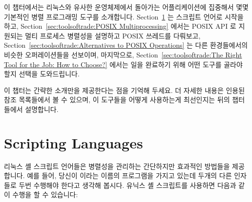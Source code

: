 
%

이 챕터에서는 리눅스와 유사한 운영체제에서 돌아가는 어플리케이션에 집중해서
몇몇 기본적인 병렬 프로그래밍 도구를 소개합니다.
Section~\ref{sec:toolsoftrade:Scripting Languages} 는 스크립트 언어로 시작을
하고,
Section~\ref{sec:toolsoftrade:POSIX Multiprocessing} 에서는 POSIX API 로
지원되는 멀티 프로세스 병렬성을 설명하고 POSIX 쓰레드를 다뤄보고,
Section~\ref{sec:toolsoftrade:Alternatives to POSIX Operations}
는 다른 환경들에서의 비슷한 오퍼레이션들을 선보이며, 마지막으로,
Section~\ref{sec:toolsoftrade:The Right Tool for the Job: How to Choose?}
에서는 일을 완료하기 위해 어떤 도구를 골라야 할지 선택을 도와드립니다.

이 챕터는 간략한 소개만을 제공한다는 점을 기억해 두세요.
더 자세한 내용은 인용된 참조 목록들에서 볼 수 있으며, 이 도구들을 어떻게
사용하는게 최선인지는 뒤의 챕터들에서 설명합니다.

\section{Scripting Languages}
\label{sec:toolsoftrade:Scripting Languages}

리눅스 셸 스크립트 언어들은 병렬성을 관리하는 간단하지만 효과적인 방법들을
제공합니다.
예를 들어, 당신이  이라는 이름의 프로그램을 가지고 있는데 두개의
다른 인자들로 두번 수행해야 한다고 생각해 봅시다.
유닉스 셸 스크립트를 사용하면 다음과 같이 수행을 할 수 있습니다:

